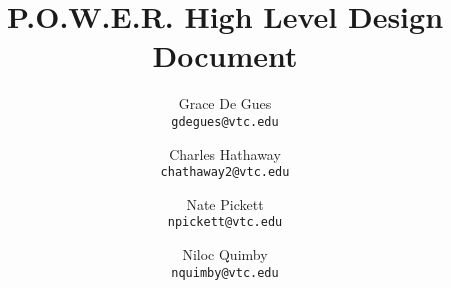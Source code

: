 \documentclass[titlepage]{report}
\begin{document}
\title{P.O.W.E.R. High Level Design Document}
\author{
  Grace De Gues\\
  \texttt{gdegues@vtc.edu}
  \and
  Charles Hathaway\\
  \texttt{chathaway2@vtc.edu}
  \and
  Nate Pickett\\
  \texttt{npickett@vtc.edu}
  \and
  Niloc Quimby\\
  \texttt{nquimby@vtc.edu}
}
\maketitle

\tableofcontents




\end{document}
